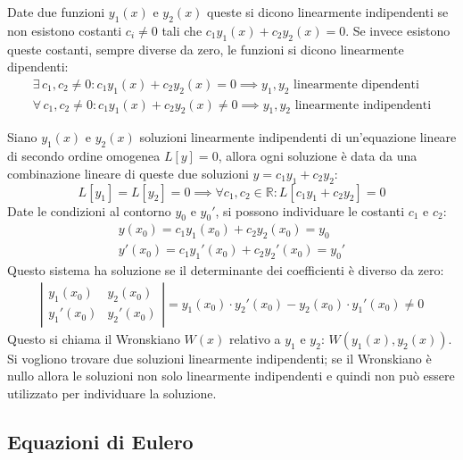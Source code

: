 \documentclass{article}
\numberwithin{equation}{subsection}
\begin{document}
Date due funzioni $y_1(x)$ e $y_2(x)$ queste si dicono linearmente indipendenti se non esistono costanti $c_i\neq0$ tali che $c_1y_1(x)+c_2y_2(x)=0$. Se invece esistono queste costanti, sempre diverse da zero, le funzioni si dicono linearmente dipendenti:
\begin{gather}
    \exists\,c_1,c_2\neq0:c_1y_1(x)+c_2y_2(x)=0\implies y_1,y_2\mbox{ linearmente dipendenti}\\
    \forall\,c_1,c_2\neq0:c_1y_1(x)+c_2y_2(x)\neq0\implies y_1,y_2\mbox{ linearmente indipendenti}
\end{gather}


Siano $y_1(x)$ e $y_2(x)$ soluzioni linearmente indipendenti di un'equazione lineare di secondo ordine omogenea $L[y]=0$, allora ogni soluzione è data da una combinazione lineare di queste due soluzioni $y=c_1y_1+c_2y_2$:
\begin{equation}
    L[y_1]=L[y_2]=0\implies \forall c_1,c_2\in\mathbb{R}:L[c_1y_1+c_2y_2]=0
\end{equation}
Date le condizioni al contorno $y_0$ e $y_0'$, si possono individuare le costanti $c_1$ e $c_2$:
\begin{gather*}
    y(x_0)=c_1y_1(x_0)+c_2y_2(x_0)=y_0\\
    y'(x_0)=c_1y_1'(x_0)+c_2y_2'(x_0)=y_0'
\end{gather*}
Questo sistema ha soluzione se il determinante dei coefficienti è diverso da zero:
\begin{gather*}
    \left|\begin{matrix}
        y_1(x_0) & y_2(x_0)\\
        y_1'(x_0) & y_2'(x_0)
    \end{matrix}\right|=y_1(x_0)\cdot y_2'(x_0)-y_2(x_0)\cdot y_1'(x_0)\neq0
\end{gather*}
Questo si chiama il Wronskiano $W(x)$ relativo a $y_1$ e $y_2$: $W(y_1(x),y_2(x))$.  
Si vogliono trovare due soluzioni linearmente indipendenti; se il Wronskiano è nullo allora le soluzioni non solo linearmente indipendenti e quindi non può essere utilizzato per individuare la soluzione. 


\subsection{Equazioni di Eulero}
\end{document}
